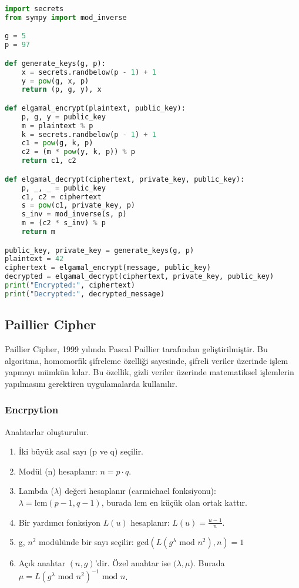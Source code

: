 \begin{lstlisting}[language=Python]
import secrets
from sympy import mod_inverse

g = 5
p = 97

def generate_keys(g, p):
    x = secrets.randbelow(p - 1) + 1
    y = pow(g, x, p)
    return (p, g, y), x

def elgamal_encrypt(plaintext, public_key):
    p, g, y = public_key
    m = plaintext % p
    k = secrets.randbelow(p - 1) + 1
    c1 = pow(g, k, p)
    c2 = (m * pow(y, k, p)) % p
    return c1, c2

def elgamal_decrypt(ciphertext, private_key, public_key):
    p, _, _ = public_key
    c1, c2 = ciphertext
    s = pow(c1, private_key, p)
    s_inv = mod_inverse(s, p)
    m = (c2 * s_inv) % p
    return m

public_key, private_key = generate_keys(g, p)
plaintext = 42
ciphertext = elgamal_encrypt(message, public_key)
decrypted = elgamal_decrypt(ciphertext, private_key, public_key)
print("Encrypted:", ciphertext)
print("Decrypted:", decrypted_message)
\end{lstlisting}

\newpage

\subsection{Paillier Cipher}

Paillier Cipher, 1999 yılında Pascal Paillier tarafından geliştirilmiştir. Bu algoritma, homomorfik şifreleme özelliği sayesinde, şifreli veriler üzerinde işlem yapmayı mümkün kılar. Bu özellik, gizli veriler üzerinde matematiksel işlemlerin yapılmasını gerektiren uygulamalarda kullanılır.

\subsubsection{Encrpytion}

Anahtarlar oluşturulur.

\begin{enumerate}
    \item İki büyük asal sayı (p ve q) seçilir.
    \item Modül (n) hesaplanır: $n = p \cdot q$.
    \item Lambda ($\lambda$) değeri hesaplanır (carmichael fonksiyonu): $\lambda = \text{lcm}(p - 1, q - 1)$, burada lcm en küçük olan ortak kattır.
    \item Bir yardımcı fonksiyon $L(u)$ hesaplanır: $L(u) = \frac{u - 1}{n}$.
    \item g, $n^2$ modülünde bir sayı seçilir: $\text{gcd}(L(g^{\lambda} \text{ mod } n^2), n) = 1$
    \item Açık anahtar $(n, g)$'dir. Özel anahtar ise $(\lambda, \mu$). Burada $\mu = L(g^{\lambda} \text{ mod } n^2)^{-1} \text{ mod } n$.
\end{enumerate}

